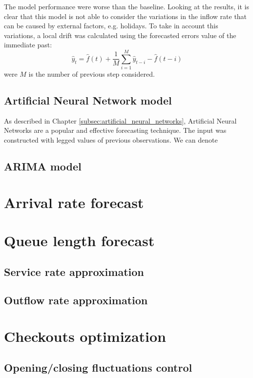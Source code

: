 The model performance were worse than the baseline. Looking at the results, it is clear that this model is not able to consider the variations in the inflow rate that can be caused by external factors, e.g. holidays. To take in account this variations, a local drift was calculated using the forecasted errors value of the immediate past:
\[ \hat{y}_t = \hat{f}(t) + \frac{1}{M} \sum_{i=1}^{M} \hat{y}_{t-i} - \hat{f}(t-i) \]
were \(M\) is the number of previous step considered.

\subsection{Artificial Neural Network model}
\label{subsec:ann_model}
As described in Chapter \ref{subsec:artificial_neural_networks}, Artificial Neural Networks are a popular and effective forecasting technique. The input was constructed with legged values of previous observations. We can denote 

\subsection{ARIMA model}
\label{subsec:arima_model}

\section{Arrival rate forecast}
\label{sec:arrival_rate_forecast}

\section{Queue length forecast}
\label{sec:queue_length_forecasting}

\subsection{Service rate approximation}
\label{subsec:service_rate_approximation}

\subsection{Outflow rate approximation}
\label{subsec:outflow_rate_approximation}

\section{Checkouts optimization}
\label{sec:checkouts_optimization}

\subsection{Opening/closing fluctuations control}
\label{subsec:opening_closing_fluctuations_control}

\clearpage